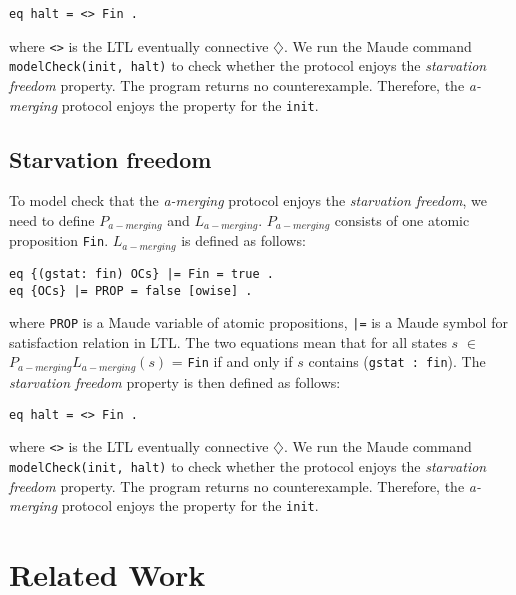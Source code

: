 \documentclass[10pt, conference, compsocconf]{IEEEtran}
\begin{document}
\begin{small}
\begin{verbatim}
eq halt = <> Fin .
\end{verbatim}
\end{small}

\noindent where \verb!<>! is the LTL eventually connective $\diamondsuit$.
We run the Maude command \verb!modelCheck(init, halt)! to check whether the protocol enjoys the \textit{starvation freedom} property.
The program returns no counterexample.
Therefore, the \textit{a-merging} protocol enjoys the property for the \verb!init!.

\subsection{Starvation freedom}
To model check that the \textit{a-merging} protocol enjoys the \textit{starvation freedom}, we need to define $P_{a-merging}$ and $L_{a-merging}$. 
$P_{a-merging}$ consists of one atomic proposition \verb!Fin!.
$L_{a-merging}$ is defined as follows:

\begin{small}
\begin{verbatim}
eq {(gstat: fin) OCs} |= Fin = true .
eq {OCs} |= PROP = false [owise] .
\end{verbatim}
\end{small}

where \verb!PROP! is a Maude variable of atomic propositions, \verb!|=! is a Maude symbol for satisfaction relation in LTL. 
The two equations mean that for all states $s$ $\in$ $P_{a-merging}L_{a-merging}(s)$ = {\verb!Fin!} if and only if $s$ contains (\verb!gstat : fin!). 
The \textit{starvation freedom} property is then defined as follows:

\begin{small}
\begin{verbatim}
eq halt = <> Fin .
\end{verbatim}
\end{small}

\noindent where \verb!<>! is the LTL eventually connective $\diamondsuit$.
We run the Maude command \verb!modelCheck(init, halt)! to check whether the protocol enjoys the \textit{starvation freedom} property.
The program returns no counterexample.
Therefore, the \textit{a-merging} protocol enjoys the property for the \verb!init!.


 
 
\section{Related Work}
 \label{sect_Relate}
 
\end{document}
